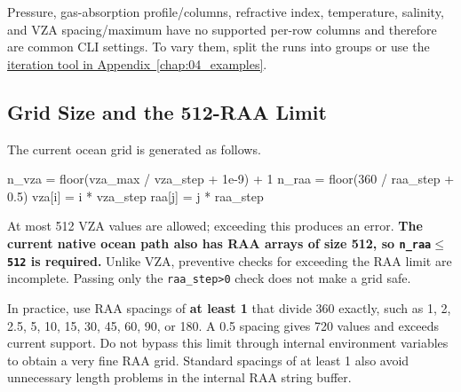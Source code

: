 Pressure, gas-absorption profile/columns, refractive index, temperature, salinity, and VZA spacing/maximum have no supported per-row columns and therefore are common CLI settings. To vary them, split the runs into groups or use the \hyperref[chap:04_examples]{iteration tool in Appendix~\ref*{chap:04_examples}}.

\subsection{Grid Size and the 512-RAA Limit}
\label{sec:auto:08_input_formats:2.5}
The current ocean grid is generated as follows.


\begin{ManualCode}
n_vza = floor(vza_max / vza_step + 1e-9) + 1
n_raa = floor(360 / raa_step + 0.5)
vza[i] = i * vza_step
raa[j] = j * raa_step
\end{ManualCode}

At most 512 VZA values are allowed; exceeding this produces an error. \textbf{The current native ocean path also has RAA arrays of size 512, so \texttt{n\_\allowbreak{}raa\ensuremath{\leq}512} is required.} Unlike VZA, preventive checks for exceeding the RAA limit are incomplete. Passing only the \texttt{raa\_\allowbreak{}step>0} check does not make a grid safe.

In practice, use RAA spacings of \textbf{at least 1\textdegree{}} that divide 360 exactly, such as 1, 2, 2.5, 5, 10, 15, 30, 45, 60, 90, or 180\textdegree{}. A 0.5\textdegree{} spacing gives 720 values and exceeds current support. Do not bypass this limit through internal environment variables to obtain a very fine RAA grid. Standard spacings of at least 1\textdegree{} also avoid unnecessary length problems in the internal RAA string buffer.

